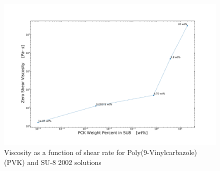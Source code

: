 \begin{figure}[!th]
\centering
\includegraphics[width=\textwidth]{./Figures/c_vs_v_PCKinSU8.png}
\decoRule
\caption[Viscosity as a function of shear rate for Poly(9-Vinylcarbazole) (PVK) and SU-8 2002 solutions]{Viscosity as a function of shear rate for Poly(9-Vinylcarbazole) (PVK) and SU-8 2002 solutions}
\label{fig:c_vs_v_PCKinSU8}
\end{figure}